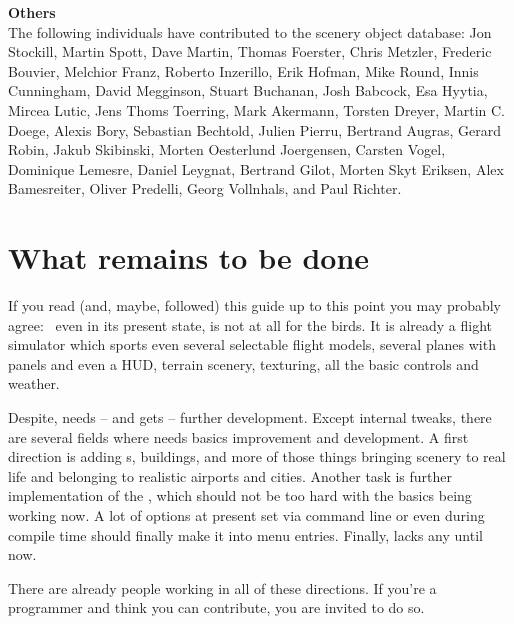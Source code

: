 \noindent \textbf{Others}\\
The following individuals have contributed to the scenery object database:
   Jon Stockill, Martin Spott, Dave Martin, Thomas Foerster, Chris Metzler, Frederic
   Bouvier, Melchior Franz, Roberto Inzerillo, Erik Hofman, Mike Round,
   Innis Cunningham, David Megginson, Stuart Buchanan, Josh Babcock,
   Esa Hyytia, Mircea Lutic, Jens Thoms Toerring, Mark Akermann,
   Torsten Dreyer, Martin C. Doege, Alexis Bory, Sebastian Bechtold,
   Julien Pierru, Bertrand Augras, Gerard Robin, Jakub Skibinski,
   Morten Oesterlund Joergensen, Carsten Vogel, Dominique Lemesre,
   Daniel Leygnat, Bertrand Gilot, Morten Skyt Eriksen, Alex
   Bamesreiter, Oliver Predelli, Georg Vollnhals, and Paul Richter.


\section{What remains to be done}

If you read (and, maybe, followed) this guide up to this point you may probably agree: \FlightGear{}\, even in its present state, is not at all for the birds. It is
already a flight simulator which sports even several selectable flight models, several planes with panels and even a HUD, terrain scenery, texturing, all the basic controls and weather.

Despite, \FlightGear{} needs -- and gets -- further development. Except internal tweaks,
there are several fields where \FlightGear{} needs basics improvement and development. A
first direction is adding s, buildings, and more of those things bringing
scenery to real life and belonging to realistic airports and cities. Another task is further
implementation of the , which should not be too hard with the basics
being working now. A lot of options at present set via command line or even during
compile time should finally make it into menu entries. Finally, \FlightGear{} lacks any
 until now.

There are already people working in all of these directions. If you're a programmer and
think you can contribute, you are invited to do so.

